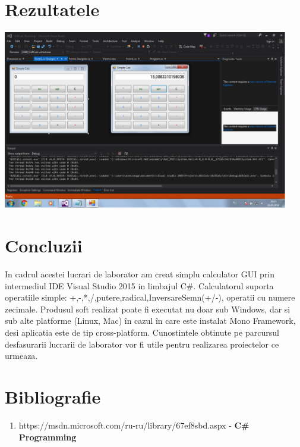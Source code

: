 \documentclass[12pt]{article}
\begin{document}
\section {Rezultatele}
\includegraphics[width=12.5cm]{images/1}
\section*{Concluzii}
In cadrul acestei lucrari de laborator am creat simplu calculator GUI prin intermediul IDE Visual Studio 2015 in limbajul C\#. Calculatorul suporta operatiile simple: +,-,*,/,putere,radical,InversareSemn(+/-), operatii cu numere zecimale. Produsul soft realizat poate fi executat nu doar sub Windows, dar si sub alte platforme (Linux, Mac) în cazul în care este instalat Mono Framework, desi  aplicatia este de tip cross-platform. Cunostintele obtinute pe parcursul desfasurarii lucrarii de laborator vor fi utile pentru realizarea proiectelor ce urmeaza.
\section*{Bibliografie}
\begin{enumerate}
\item https://msdn.microsoft.com/ru-ru/library/67ef8sbd.aspx - \textbf{C\# Programming}
\end{enumerate}
\end{document}
